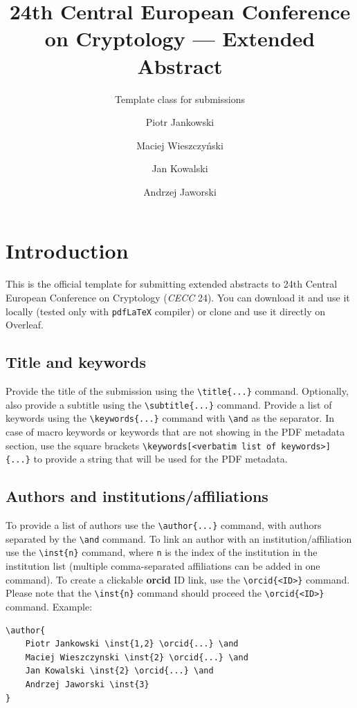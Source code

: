 \documentclass{ceccsub}
\author{
    Piotr Jankowski \inst{1,2} \orcid{1234-1234-1234-1234} \and 
    Maciej Wieszczyński \inst{2} \orcid{3333-3333-3333-3333} \and
    Jan Kowalski \inst{2} \orcid{2222-2222-2222-2222} \and
    Andrzej Jaworski \inst{3}
}
\institute{
    Politechnika Wrocławska, Wrocław, Poland, \email{pjankowski@pwr.edu.pl} \and 
    Wojskowa Akademia Techniczna\footnote{Sponsored by XYZ.}, Warsaw, Poland, \emails[wat.edu.pl]{pjankowski}{mwieszczynski}{jkowalski} \and
    Naukowa i Akademicka Sieć Komputerowa, Warsaw, Poland, \email{ajaworski@nask.pl}
}
\title{24th Central European Conference on Cryptology --- Extended Abstract}
\subtitle{Template class for submissions}
\begin{document}
\maketitle

\section*{Introduction}

This is the official template for submitting extended abstracts to 24th Central European Conference on Cryptology (\textit{CECC} 24). You can download it and use it locally (tested only with \lstinline|pdfLaTeX| compiler) or clone and use it directly on Overleaf. 

\subsection{Title and keywords}

Provide the title of the submission using the \lstinline|\title{...}| command. 
Optionally, also provide a subtitle using the \lstinline|\subtitle{...}| command. 
Provide a list of keywords using the \lstinline|\keywords{...}| command with \lstinline|\and| as the separator. In case of macro keywords or keywords that are not showing in the PDF metadata section, 
use the square brackets \lstinline|\keywords[<verbatim list of keywords>]{...}| to provide a string that will be used for the PDF metadata. 

\subsection{Authors and institutions/affiliations}

To provide a list of authors use the \lstinline|\author{...}| command, with authors separated by the \lstinline|\and| command. To link an author with an institution/affiliation use the \lstinline|\inst{n}| command, where \lstinline|n| is the index of the institution in the institution list (multiple comma-separated affiliations can be added in one command). To create a clickable \textbf{orcid} ID link, use the \lstinline|\orcid{<ID>}| command. Please note that the \lstinline|\inst{n}| command should proceed the \lstinline|\orcid{<ID>}| command. Example:

\begin{lstlisting}
\author{
    Piotr Jankowski \inst{1,2} \orcid{...} \and 
    Maciej Wieszczynski \inst{2} \orcid{...} \and
    Jan Kowalski \inst{2} \orcid{...} \and
    Andrzej Jaworski \inst{3}
}
\end{lstlisting}
\end{document}

